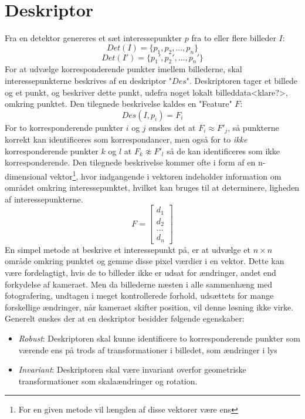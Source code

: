\section{Deskriptor}
Fra en detektor genereres et sæt interessepunkter $p$ fra to eller flere billeder $I$:
$$ Det(I) = \lbrace p_1,p_2,...,p_n \rbrace $$
\vspace{-1em}
$$
Det(I') = \lbrace p_1',p_2',...,p_n' \rbrace
$$
For at udvælge korresponderende punkter imellem billederne, skal interessepunkterne beskrives af en deskriptor "$Des$". Deskriptoren tager et billede og et punkt, og beskriver dette punkt, udefra noget lokalt billeddata<klare?>, omkring punktet. Den tilegnede beskrivelse kaldes en "Feature" $F$:
$$ Des(I,p_i)=F_i $$
For to korresponderende punkter $i$ og $j$ ønskes det at $F_i \approx F'_j$, så punkterne korrekt kan identificeres som korrespondancer, men også for to \textit{ikke} korresponderende punkter $k$ og $l$ at $F_k \not\approx F'_l$ så de kan identificeres som ikke korresponderende. Den tilegnede beskrivelse kommer ofte i form af en n-dimensional vektor\footnote{For en given metode vil længden af disse vektorer være ens}, hvor indgangende i vektoren indeholder information om området omkring interessepunktet, hvilket kan bruges til at determinere, ligheden af interessepunkterne.
$$ F =
\begin{bmatrix}
d_1 \\
d_2 \\
. . . \\
d_n
\end{bmatrix}
$$
En simpel metode at beskrive et interessepunkt på, er at udvælge et $n \times n$ område omkring punktet og gemme disse pixel værdier i en vektor. Dette kan være fordelagtigt, hvis de to billeder ikke er udsat for ændringer, andet end forkydelse af kameraet. Men da billederne næsten i alle sammenhæng med fotografering, undtagen i meget kontrollerede forhold, udsættets for mange forskellige ændringer, når kameraet skifter position, vil denne løsning ikke virke. Generelt ønskes der at en deskriptor besidder følgende egenskaber:
\begin{itemize}
\item{\textit{Robust}: Deskriptoren skal kunne identificere to korresponderende punkter som værende ens på trods af transformationer i billedet, som ændringer i lys}
\item{\textit{Invariant}: Deskriptoren skal være invariant overfor geometriske transformationer som skalaændringer og rotation.}
\end{itemize}
